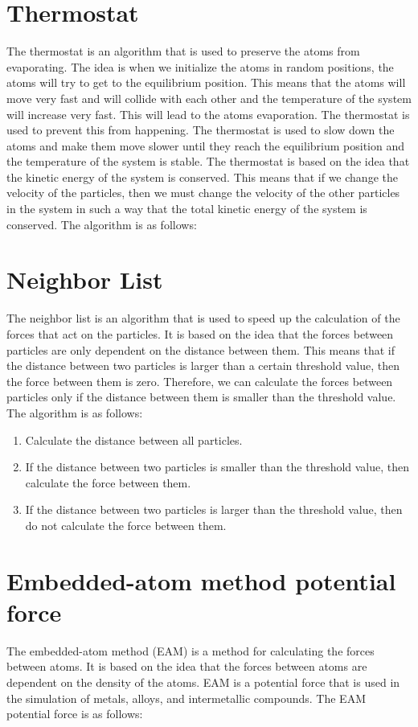 \section{Thermostat}
The thermostat is an algorithm that is used to preserve the atoms from evaporating. The idea is when we initialize the atoms in random positions, the atoms will try to get to the equilibrium position. This means that the atoms will move very fast and will collide with each other and the temperature of the system will increase very fast. This will lead to the atoms evaporation. The thermostat is used to prevent this from happening. The thermostat is used to slow down the atoms and make them move slower until they reach the equilibrium position and the temperature of the system is stable. The thermostat is based on the idea that the kinetic energy of the system is conserved. This means that if we change the velocity of the particles, then we must change the velocity of the other particles in the system in such a way that the total kinetic energy of the system is conserved. The algorithm is as follows:


\section{Neighbor List}
The neighbor list is an algorithm that is used to speed up the calculation of the forces that act on the particles. It is based on the idea that the forces between particles are only dependent on the distance between them. This means that if the distance between two particles is larger than a certain threshold value, then the force between them is zero. Therefore, we can calculate the forces between particles only if the distance between them is smaller than the threshold value. The algorithm is as follows:
\begin{enumerate}
    \item Calculate the distance between all particles.
    \item If the distance between two particles is smaller than the threshold value, then calculate the force between them.
    \item If the distance between two particles is larger than the threshold value, then do not calculate the force between them.
\end{enumerate}

\section{Embedded-atom method potential force}
The embedded-atom method (EAM) is a method for calculating the forces between atoms. It is based on the idea that the forces between atoms are dependent on the density of the atoms. EAM is a potential force that is used in the simulation of metals, alloys, and intermetallic compounds. The EAM potential force is as follows:



